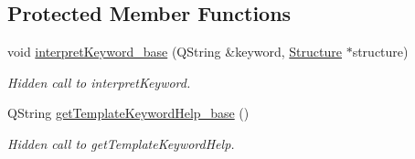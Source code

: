 \subsection*{Protected Member Functions}
\begin{DoxyCompactItemize}
\item 
\hypertarget{classGlobalSearch_1_1OptBase_abff4ef4b7e717351103658ff33dfa561}{void \hyperlink{classGlobalSearch_1_1OptBase_abff4ef4b7e717351103658ff33dfa561}{interpret\-Keyword\-\_\-base} (Q\-String \&keyword, \hyperlink{classGlobalSearch_1_1Structure}{Structure} $\ast$structure)}\label{classGlobalSearch_1_1OptBase_abff4ef4b7e717351103658ff33dfa561}

\begin{DoxyCompactList}\small\item\em Hidden call to interpret\-Keyword. \end{DoxyCompactList}\item 
\hypertarget{classGlobalSearch_1_1OptBase_a41a41f9733da4a68244bc56195ea835b}{Q\-String \hyperlink{classGlobalSearch_1_1OptBase_a41a41f9733da4a68244bc56195ea835b}{get\-Template\-Keyword\-Help\-\_\-base} ()}\label{classGlobalSearch_1_1OptBase_a41a41f9733da4a68244bc56195ea835b}

\begin{DoxyCompactList}\small\item\em Hidden call to get\-Template\-Keyword\-Help. \end{DoxyCompactList}\end{DoxyCompactItemize}

